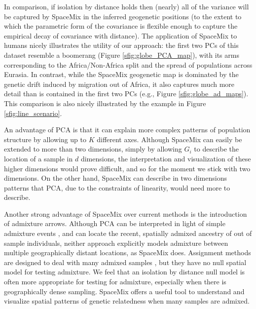 \documentclass[12pt]{article}
\begin{document}
In comparison, if isolation by distance holds then (nearly) all of the variance will be captured by SpaceMix in the inferred geogenetic positions 
(to the extent to which the parametric form of the covariance is flexible enough to capture the empirical decay of covariance with distance). 
The application of SpaceMix to humans nicely illustrates the utility of our approach: 
the first two PCs of this dataset resemble a boomerang (Figure \ref{sfig:globe_PCA_map}), 
with its arms corresponding to the Africa/Non-Africa split and the spread of populations across Eurasia. 
In contrast, while the SpaceMix geogenetic map is dominated by the genetic drift induced by migration out of Africa,
it also captures much more detail than is contained in the first two PCs (e.g., Figure \ref{sfig:globe_ad_maps}).
This comparison is also nicely illustrated by the example in Figure \ref{sfig:line_scenario}.

An advantage of PCA is that it can explain more complex patterns of population structure by allowing up to $K$ different axes.
Although SpaceMix can easily be extended to more than two dimensions, 
simply by allowing $G_i$ to describe the location of a sample in $d$ dimensions, 
the interpretation and visualization of these higher dimensions would prove difficult, 
and so for the moment we stick with two dimensions.
On the other hand, SpaceMix can describe in two dimensions patterns that PCA,
due to the constraints of linearity, would need more to describe.

Another strong advantage of SpaceMix over current methods is the introduction of admixture arrows. 
Although PCA can be interpreted in light of simple admixture events \citep{mcvean_genealogical_2009}, 
and \citet{yang_model-based_2012,yang_spatial_2014} can locate the recent, spatially admixed ancestry of out of sample individuals,
neither approach explicitly models admixture between multiple geographically distant locations,
as SpaceMix does.
Assignment methods are designed to deal with many admixed samples \citep{STRUCTURE}, 
but they have no null spatial model for testing admixture.
We feel that an isolation by distance null model is often more appropriate for testing for admixture, 
especially when there is geographically dense sampling. 
SpaceMix offers a useful tool to understand and visualize spatial patterns of genetic relatedness when many samples are admixed. 
\end{document}

